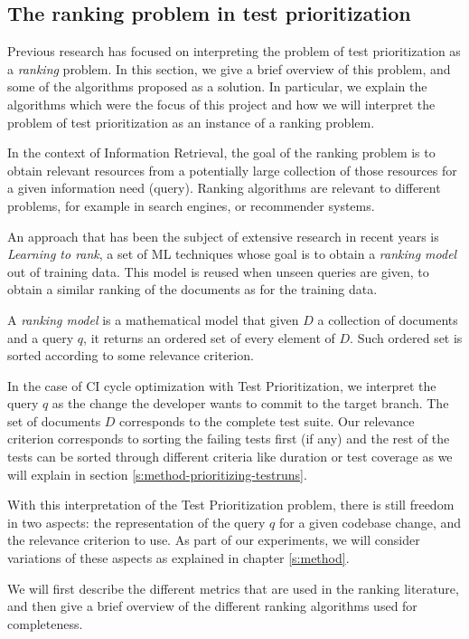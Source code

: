 \subsection{The ranking problem in test prioritization}

Previous research has focused on interpreting the problem of test prioritization as a \emph{ranking} 
problem. In this section, we give a brief overview of this problem, and some of the algorithms proposed
as a solution. In particular, we explain the algorithms which were the focus of this project
and how we will interpret the problem of test prioritization as an instance of a ranking problem.

In the context of Information Retrieval, the goal of the ranking problem is to obtain relevant resources
from a potentially large collection of those resources for a given information need (query). 
Ranking algorithms are relevant to different problems, for example in search engines, or 
recommender systems.

An approach that has been the subject of extensive research in recent years is \emph{Learning to rank},
a set of ML techniques whose goal is to obtain a \emph{ranking model} out of
training data. This model is reused when unseen queries are given,
to obtain a similar ranking of the documents as for the training data. 

A \emph{ranking model} is a mathematical model that given $D$ a collection of documents
and a query $q$, it returns an ordered set of every element of $D$. Such ordered set is
sorted according to some relevance criterion.

In the case of CI cycle optimization with Test Prioritization, we interpret the query $q$ as the
change the developer wants to commit to the target branch. The set of documents $D$ corresponds to
the complete test suite. Our relevance criterion corresponds to sorting the
failing tests first (if any) and the rest of the tests can be sorted through different criteria
like duration or test coverage as we will explain in section \ref{s:method-prioritizing-testruns}.

With this interpretation of the Test Prioritization problem, there is still freedom 
in two aspects: the representation of the query $q$ for a given codebase change, and the 
relevance criterion to use. As part of our experiments, we will consider variations
of these aspects as explained in chapter \ref{s:method}.

We will first describe the different metrics that are used in the ranking literature, and then
give a brief overview of the different ranking algorithms used for completeness.

